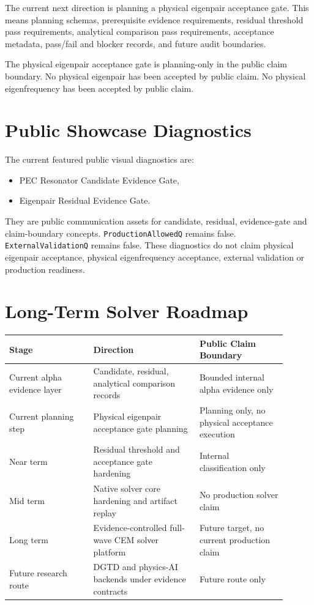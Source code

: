 \documentclass[11pt,a4paper]{article}
\newcommand{\code}[1]{\texttt{#1}}
\begin{document}
The current next direction is planning a physical eigenpair acceptance gate. This means planning schemas, prerequisite evidence requirements, residual threshold pass requirements, analytical comparison pass requirements, acceptance metadata, pass/fail and blocker records, and future audit boundaries.

The physical eigenpair acceptance gate is planning-only in the public claim boundary. No physical eigenpair has been accepted by public claim. No physical eigenfrequency has been accepted by public claim.

\section{Public Showcase Diagnostics}

The current featured public visual diagnostics are:

\begin{itemize}
  \item PEC Resonator Candidate Evidence Gate,
  \item Eigenpair Residual Evidence Gate.
\end{itemize}

They are public communication assets for candidate, residual, evidence-gate and claim-boundary concepts. \code{ProductionAllowedQ} remains false. \code{ExternalValidationQ} remains false. These diagnostics do not claim physical eigenpair acceptance, physical eigenfrequency acceptance, external validation or production readiness.

\section{Long-Term Solver Roadmap}

\begin{center}
\begin{tabular}{p{0.27\linewidth}p{0.34\linewidth}p{0.29\linewidth}}
\toprule
Stage & Direction & Public Claim Boundary \\
\midrule
Current alpha evidence layer & Candidate, residual, analytical comparison records & Bounded internal alpha evidence only \\
Current planning step & Physical eigenpair acceptance gate planning & Planning only, no physical acceptance execution \\
Near term & Residual threshold and acceptance gate hardening & Internal classification only \\
Mid term & Native solver core hardening and artifact replay & No production solver claim \\
Long term & Evidence-controlled full-wave CEM solver platform & Future target, no current production claim \\
Future research route & DGTD and physics-AI backends under evidence contracts & Future route only \\
\bottomrule
\end{tabular}
\end{center}
\end{document}
